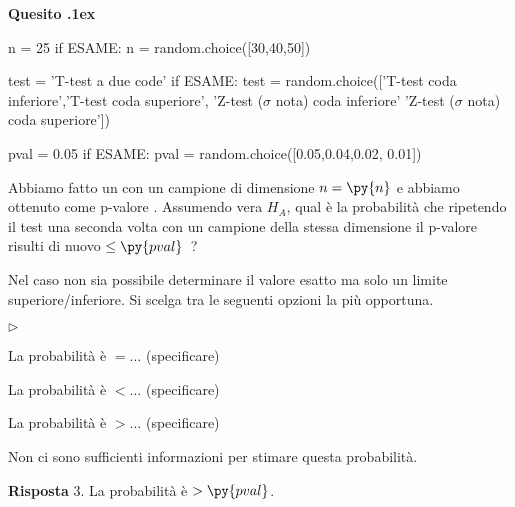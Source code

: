 \documentclass[11pt,twoside,a4paper]{article}
\newcommand{\mylabel}[1]{#1\hfill}
\renewenvironment{itemize}
  {\begin{list}{$\triangleright$}{%
   \setlength{\parskip}{0mm}
   \setlength{\topsep}{.4\baselineskip}
   \setlength{\rightmargin}{0mm}
   \setlength{\listparindent}{0mm}
   \setlength{\itemindent}{0mm}
   \setlength{\labelwidth}{2ex}
   \setlength{\itemsep}{.4\baselineskip}
   \setlength{\parsep}{0mm}
   \setlength{\partopsep}{0mm}
   \setlength{\labelsep}{1ex}
   \setlength{\leftmargin}{\labelwidth+\labelsep}
   \let\makelabel\mylabel}}{%
   \end{list}\vspace*{-1.3mm}}
\newcounter{quesito}
\newenvironment{question}{\bigskip\addtocounter{quesito}{1}\par\textbf{Quesito \thequesito.\kern1ex}}{\vspace{\parskip}}
\newenvironment{answer}{\par\textbf{Risposta\quad}}{\vspace{\parskip}}
\begin{document}
\clearpage
\begin{question} %
\begin{pycode}
n = 25
if ESAME: n = random.choice([30,40,50])

test = 'T-test a due code'
if ESAME: test = random.choice(['T-test coda inferiore','T-test coda superiore', 'Z-test ($\sigma$ nota) coda inferiore' 'Z-test ($\sigma$ nota) coda superiore'])

pval = 0.05
if ESAME: pval = random.choice([0.05,0.04,0.02, 0.01])
\end{pycode}
Abbiamo fatto un  con un campione di dimensione $n=\py{n}$ e abbiamo ottenuto come p-valore .
Assumendo vera $H_A$, qual è la probabilità che ripetendo il test una seconda volta con un campione della stessa dimensione il p-valore risulti di nuovo $\le\py{pval}$~?

Nel caso non sia possibile determinare il valore esatto ma solo un limite superiore/inferiore. Si scelga tra le seguenti opzioni la più opportuna.
\begin{itemize}
\item[1.] La probabilità è $=\dots$ (specificare)
\item[2.] La probabilità è $<\dots$ (specificare)
\item[3.] La probabilità è $>\dots$ (specificare)
\item[4.] Non ci sono sufficienti informazioni per stimare questa probabilità.
\end{itemize}
\begin{answer}
{\color{blue}3. La probabilità è $>\py{pval}$.}
\end{answer}
\end{question}
\end{document}
